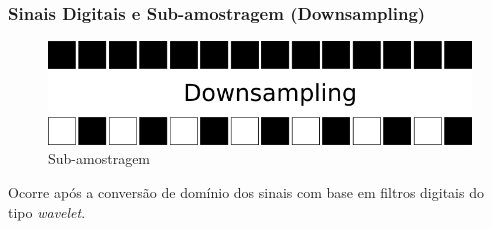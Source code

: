 \begin{frame}
	\frametitle{Sinais Digitais e Sub-amostragem (Downsampling)}
	\begin{figure}
		\centering
		\includegraphics[width=0.7\linewidth]{../monography/images/downsampling}
		\caption{Sub-amostragem}
		\label{fig:downsampling}
	\end{figure}
	\par Ocorre após a conversão de domínio dos sinais com base em filtros digitais do tipo \textit{wavelet}.
\end{frame}